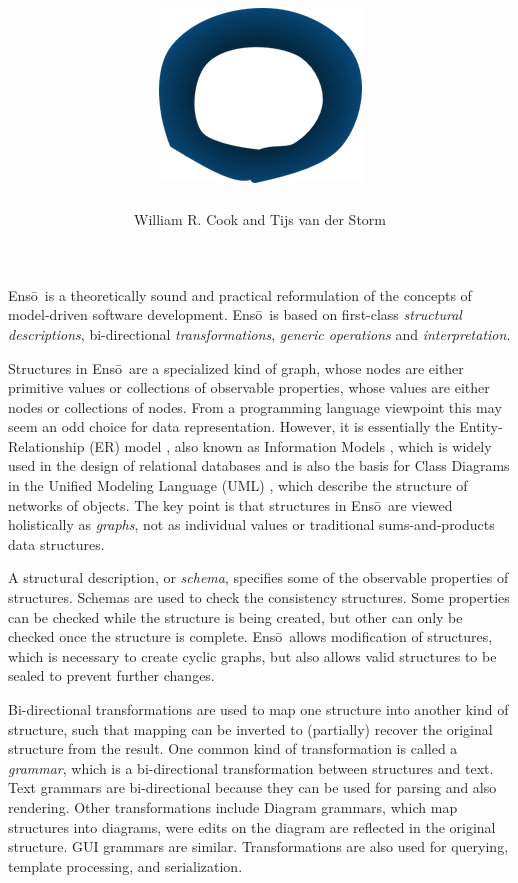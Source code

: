 \documentclass[11pt]{article}
\title{\includegraphics[scale=0.15]{enso.png}\\\Enso}
\author{William R. Cook and Tijs van der Storm}
\newcommand{\Enso}{Ens\={o}}
\begin{document}
\maketitle


\Enso\ is a theoretically sound and practical reformulation of the 
concepts of model-driven software development. \Enso\ is based
on first-class \textit{structural descriptions}, 
bi-directional \textit{transformations}, \textit{generic operations} 
and \textit{interpretation}.

Structures in \Enso\ are a specialized kind of graph,
whose nodes are either primitive values or collections of observable
properties, whose values are either nodes or collections of nodes.
From a programming language viewpoint this may seem an odd 
choice for data representation. However, it is essentially the
Entity-Relationship (ER) model \cite{FOO}, also known as Information
Models \cite{FOO}, which is widely used in the design of relational databases
and is also the basis for Class Diagrams in 
the Unified Modeling Language (UML) \cite{FOO}, which 
describe the structure of networks of objects.
The key point is that structures in \Enso\ are 
viewed holistically as \textit{graphs}, not as individual values
or traditional sums-and-products data structures.

A structural description, or \textit{schema}, specifies some 
of the observable properties of structures. Schemas are used to
check the consistency structures. Some properties can be checked
while the structure is being created, but other can only be checked
once the structure is complete. \Enso\ allows modification of structures,
which is necessary to create cyclic graphs, but also allows 
valid structures to be sealed to prevent further changes.

Bi-directional transformations are used to map one structure into
another kind of structure, such that mapping can be inverted to 
(partially) recover the original structure from the result.
One common kind of transformation is called a \textit{grammar},
which is a bi-directional transformation between structures and text.
Text grammars are bi-directional because they can be used for parsing
and also rendering. Other transformations include Diagram grammars,
which map structures into diagrams, were edits on the diagram are
reflected in the original structure. GUI grammars are similar.
Transformations are also used for querying, template processing, 
and serialization.
\end{document}
